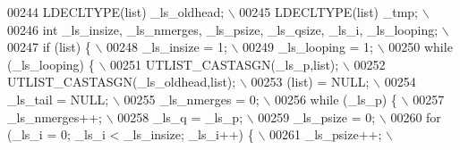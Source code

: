 \begin{DoxyCode}
00244 \textcolor{preprocessor}{  LDECLTYPE(list) \_ls\_oldhead;                                                                 \(\backslash\)}
00245 \textcolor{preprocessor}{  LDECLTYPE(list) \_tmp;                                                                        \(\backslash\)}
00246 \textcolor{preprocessor}{  int \_ls\_insize, \_ls\_nmerges, \_ls\_psize, \_ls\_qsize, \_ls\_i, \_ls\_looping;                       \(\backslash\)}
00247 \textcolor{preprocessor}{  if (list) \{                                                                                  \(\backslash\)}
00248 \textcolor{preprocessor}{    \_ls\_insize = 1;                                                                            \(\backslash\)}
00249 \textcolor{preprocessor}{    \_ls\_looping = 1;                                                                           \(\backslash\)}
00250 \textcolor{preprocessor}{    while (\_ls\_looping) \{                                                                      \(\backslash\)}
00251 \textcolor{preprocessor}{      UTLIST\_CASTASGN(\_ls\_p,list);                                                             \(\backslash\)}
00252 \textcolor{preprocessor}{      UTLIST\_CASTASGN(\_ls\_oldhead,list);                                                       \(\backslash\)}
00253 \textcolor{preprocessor}{      (list) = NULL;                                                                           \(\backslash\)}
00254 \textcolor{preprocessor}{      \_ls\_tail = NULL;                                                                         \(\backslash\)}
00255 \textcolor{preprocessor}{      \_ls\_nmerges = 0;                                                                         \(\backslash\)}
00256 \textcolor{preprocessor}{      while (\_ls\_p) \{                                                                          \(\backslash\)}
00257 \textcolor{preprocessor}{        \_ls\_nmerges++;                                                                         \(\backslash\)}
00258 \textcolor{preprocessor}{        \_ls\_q = \_ls\_p;                                                                         \(\backslash\)}
00259 \textcolor{preprocessor}{        \_ls\_psize = 0;                                                                         \(\backslash\)}
00260 \textcolor{preprocessor}{        for (\_ls\_i = 0; \_ls\_i < \_ls\_insize; \_ls\_i++) \{                                         \(\backslash\)}
00261 \textcolor{preprocessor}{          \_ls\_psize++;                                                                         \(\backslash\)}

\end{DoxyCode}
